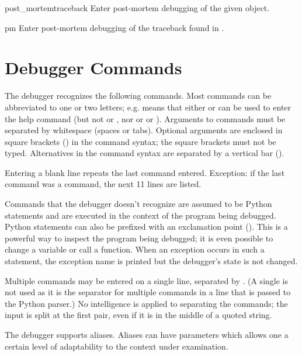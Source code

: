 \begin{funcdesc}{post_mortem}{traceback}
Enter post-mortem debugging of the given  object.
\end{funcdesc}

\begin{funcdesc}{pm}{}
Enter post-mortem debugging of the traceback found in
.
\end{funcdesc}


\section{Debugger Commands \label{debugger-commands}}

The debugger recognizes the following commands.  Most commands can be
abbreviated to one or two letters; e.g.  means that
either  or  can be used to enter the help
command (but not  or , nor  or
 or ).  Arguments to commands must be
separated by whitespace (spaces or tabs).  Optional arguments are
enclosed in square brackets (\samp{[]}) in the command syntax; the
square brackets must not be typed.  Alternatives in the command syntax
are separated by a vertical bar (\samp{|}).

Entering a blank line repeats the last command entered.  Exception: if
the last command was a  command, the next 11 lines are
listed.

Commands that the debugger doesn't recognize are assumed to be Python
statements and are executed in the context of the program being
debugged.  Python statements can also be prefixed with an exclamation
point (\samp{!}).  This is a powerful way to inspect the program
being debugged; it is even possible to change a variable or call a
function.  When an
exception occurs in such a statement, the exception name is printed
but the debugger's state is not changed.

Multiple commands may be entered on a single line, separated by
\samp{;;}.  (A single \samp{;} is not used as it is
the separator for multiple commands in a line that is passed to
the Python parser.)
No intelligence is applied to separating the commands;
the input is split at the first \samp{;;} pair, even if it is in
the middle of a quoted string.

The debugger supports aliases.  Aliases can have parameters which
allows one a certain level of adaptability to the context under
examination.

